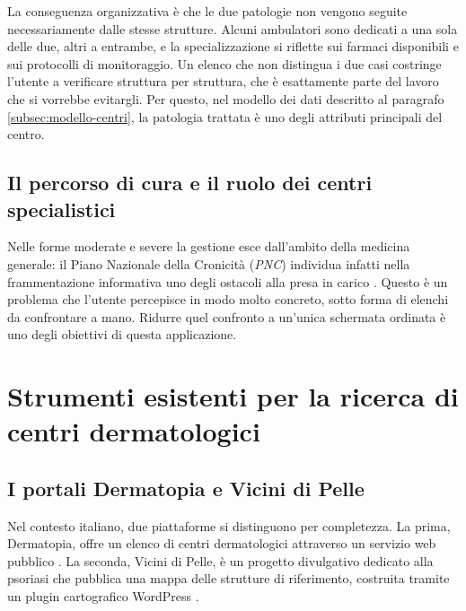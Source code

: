 La conseguenza organizzativa è che le due patologie non vengono seguite necessariamente dalle stesse strutture.
Alcuni ambulatori sono dedicati a una sola delle due, altri a entrambe, e la specializzazione si riflette sui farmaci disponibili
e sui protocolli di monitoraggio.
Un elenco che non distingua i due casi costringe l'utente a verificare struttura per struttura, che è esattamente parte del lavoro che si vorrebbe evitargli.
Per questo, nel modello dei dati descritto al paragrafo \ref{subsec:modello-centri}, la patologia trattata è uno degli attributi principali
del centro.%

\subsection{Il percorso di cura e il ruolo dei centri specialistici}\label{subsec:percorso-cura}

Nelle forme moderate e severe la gestione esce dall'ambito della medicina generale:
il Piano Nazionale della Cronicità (\textit{PNC}) individua infatti nella frammentazione informativa uno degli ostacoli alla presa
in carico \cite{pianoCronicita}.
Questo è un problema che l'utente percepisce in modo molto concreto, sotto forma di elenchi da confrontare a mano.
Ridurre quel confronto a un'unica schermata ordinata è uno degli obiettivi di questa applicazione.

\section{Strumenti esistenti per la ricerca di centri dermatologici}\label{sec:strumenti-esistenti}

\subsection{I portali Dermatopia e Vicini di Pelle}\label{subsec:portali-esistenti}

Nel contesto italiano, due piattaforme si distinguono per completezza.
La prima, Dermatopia, offre un elenco di centri dermatologici attraverso un servizio web pubblico \cite{dermatopia}.
La seconda, Vicini di Pelle, è un progetto divulgativo dedicato alla psoriasi che pubblica una mappa delle strutture di riferimento,
costruita tramite un plugin cartografico WordPress \cite{viciniDiPelle}.


